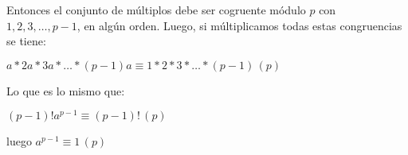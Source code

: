 \documentclass[a4paper,12pt]{report}
\newtheorem*{teo}{Teorema}
\newtheorem*{pro}{Proposición}
\begin{document}
Entonces el conjunto de múltiplos debe ser cogruente módulo $p$ con $1,2,3,\dots,p-1$, en algún orden. Luego, si múltiplicamos todas estas congruencias se tiene:

$a*2a*3a*\dots *(p-1)a \equiv 1*2*3*\dots *(p-1) \, (p)$

Lo que es lo mismo que:

$(p-1)!a^{p-1} \equiv (p-1)!\, (p)$

luego $a^{p-1} \equiv 1\, (p)$


% 
% 
% 
\end{document}
